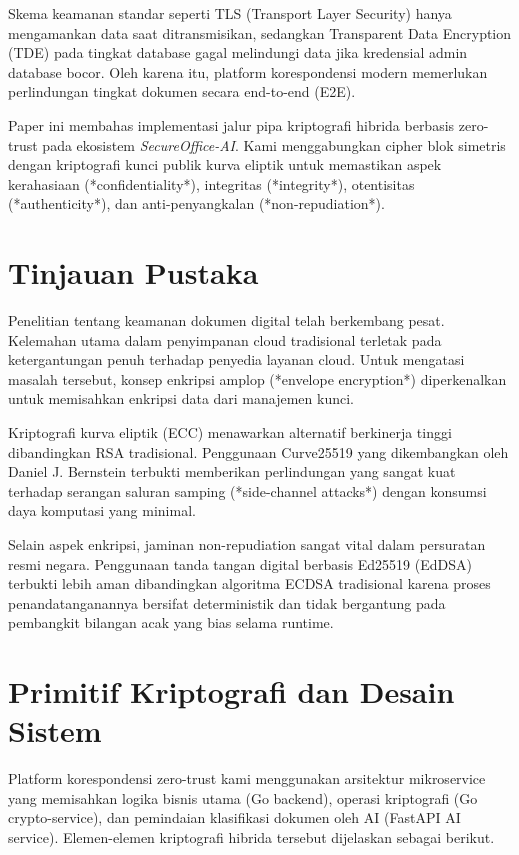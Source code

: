 \documentclass[conference]{IEEEtran}
\begin{document}
Skema keamanan standar seperti TLS (Transport Layer Security) hanya mengamankan data saat ditransmisikan, sedangkan Transparent Data Encryption (TDE) pada tingkat database gagal melindungi data jika kredensial admin database bocor. Oleh karena itu, platform korespondensi modern memerlukan perlindungan tingkat dokumen secara end-to-end (E2E).

Paper ini membahas implementasi jalur pipa kriptografi hibrida berbasis zero-trust pada ekosistem \textit{SecureOffice-AI}. Kami menggabungkan cipher blok simetris dengan kriptografi kunci publik kurva eliptik untuk memastikan aspek kerahasiaan (*confidentiality*), integritas (*integrity*), otentisitas (*authenticity*), dan anti-penyangkalan (*non-repudiation*).

\section{Tinjauan Pustaka}
Penelitian tentang keamanan dokumen digital telah berkembang pesat. Kelemahan utama dalam penyimpanan cloud tradisional terletak pada ketergantungan penuh terhadap penyedia layanan cloud. Untuk mengatasi masalah tersebut, konsep enkripsi amplop (*envelope encryption*) diperkenalkan untuk memisahkan enkripsi data dari manajemen kunci.

Kriptografi kurva eliptik (ECC) menawarkan alternatif berkinerja tinggi dibandingkan RSA tradisional. Penggunaan Curve25519 yang dikembangkan oleh Daniel J. Bernstein terbukti memberikan perlindungan yang sangat kuat terhadap serangan saluran samping (*side-channel attacks*) dengan konsumsi daya komputasi yang minimal.

Selain aspek enkripsi, jaminan non-repudiation sangat vital dalam persuratan resmi negara. Penggunaan tanda tangan digital berbasis Ed25519 (EdDSA) terbukti lebih aman dibandingkan algoritma ECDSA tradisional karena proses penandatanganannya bersifat deterministik dan tidak bergantung pada pembangkit bilangan acak yang bias selama runtime.

\section{Primitif Kriptografi dan Desain Sistem}
Platform korespondensi zero-trust kami menggunakan arsitektur mikroservice yang memisahkan logika bisnis utama (Go backend), operasi kriptografi (Go crypto-service), dan pemindaian klasifikasi dokumen oleh AI (FastAPI AI service). Elemen-elemen kriptografi hibrida tersebut dijelaskan sebagai berikut.
\end{document}
